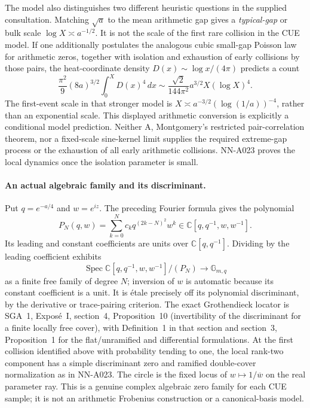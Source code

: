 The model also distinguishes two different heuristic
questions in the supplied consultation. Matching
$\sqrt a$ to the mean arithmetic gap gives a
\emph{typical-gap} or bulk scale
$\log X\asymp a^{-1/2}$. It is not the scale of the
first rare collision in the CUE model. If one
additionally postulates the analogous cubic small-gap
Poisson law for arithmetic zeros, together with
isolation and exhaustion of early collisions by
those pairs, the heat-coordinate density
$D(x)\sim\log x/(4\pi)$ predicts a count
\[
 \frac{\pi^2}{9}(8a)^{3/2}\int_0^X D(x)^4\,dx
           \sim\frac{\sqrt2}{144\pi^2}
                              a^{3/2}X(\log X)^4.
\]
The first-event scale in that stronger model is
$X\asymp a^{-3/2}(\log(1/a))^{-4}$, rather than an
exponential scale. This displayed arithmetic conversion
is explicitly a conditional model prediction.
Neither A, Montgomery's restricted pair-correlation
theorem, nor a fixed-scale sine-kernel limit supplies
the required extreme-gap process or the exhaustion
of all early arithmetic collisions. NN-A023 proves
the local dynamics once the isolation parameter is small.

\paragraph{An actual algebraic family and its discriminant.}
Put $q=e^{-a/4}$ and $w=e^{iz}$. The preceding Fourier
formula gives the polynomial
\[
              P_N(q,w)=
                    \sum_{k=0}^Nc_kq^{(2k-N)^2}w^k
                 \in\mathbb C[q,q^{-1},w,w^{-1}].
\]
Its leading and constant coefficients are units over
$\mathbb C[q,q^{-1}]$. Dividing by the leading
coefficient exhibits
\[
 \operatorname{Spec}
       \mathbb C[q,q^{-1},w,w^{-1}]/(P_N)
                      \longrightarrow\mathbb G_{m,q}
\]
as a finite free family of degree $N$; inversion of $w$
is automatic because its constant coefficient is a unit.
It is \'{e}tale precisely off its polynomial
discriminant, by the derivative or trace-pairing
criterion. The exact Grothendieck locator is
SGA~1, Expos\'e~I, section~4, Proposition~10
(invertibility of the discriminant for a finite
locally free cover), with Definition~1 in that
section and section~3, Proposition~1 for the
flat/unramified and differential formulations.
At the first collision identified above with
probability tending to one, the local rank-two
component has a simple discriminant zero and
ramified double-cover normalization as in NN-A023.
The circle is the fixed locus of
$w\mapsto1/\overline w$ on the real parameter ray.
This is a genuine complex algebraic zero family
for each CUE sample; it is not an arithmetic
Frobenius construction or a canonical-basis model.


